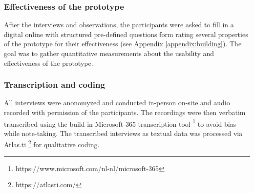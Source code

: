 \subsubsection{Effectiveness of the prototype}

After the interviews and observations, the participants were asked to fill in a digital online with structured pre-defined questions form rating several properties of the prototype for their effectiveness (see Appendix \ref{appendix:building}). The goal was to gather quantitative measurements about the usability and effectiveness of the prototype.

\subsubsection{Transcription and coding}
All interviews were anonomyzed and conducted in-person on-site and audio recorded with permission of the participants. The recordings were then verbatim transcribed using the build-in Microsoft 365 transcription tool \footnote{https://www.microsoft.com/nl-nl/microsoft-365} to avoid bias while note-taking. The transcribed interviews as textual data was processed via Atlas.ti \footnote{https://atlasti.com/} for qualitative coding.